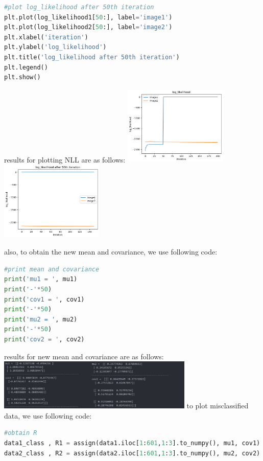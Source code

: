 \documentclass[12pt]{article}
\begin{document}
\begin{qsolve}
\begin{lstlisting}[language=Python,caption={plot NLL},label={code:plot NLL}]
#plot log_likelihood after 50th iteration
plt.plot(log_likelihood1[50:], label='image1')
plt.plot(log_likelihood2[50:], label='image2')
plt.xlabel('iteration')
plt.ylabel('log_likelihood')
plt.title('log_likelihood after 50th iteration')
plt.legend()
plt.show()
        \end{lstlisting}
    \splitqsolve
    results for plotting NLL are as follows:
    \tcblower
    \centering
    \includegraphics[width=0.37\textwidth]{outputs/output13.png}
    \label{fig:fig13}
    \includegraphics[width=0.37\textwidth]{outputs/output14.png}
    \label{fig:fig14}
    \splitqsolve

    also, to obtain the new mean and covariance, we use following code:
    \begin{lstlisting}[language=Python,caption={obtain new mean and covariance},label={code:obtain new mean and covariance}]
#print mean and covariance
print('mu1 = ', mu1)
print('-'*50)
print('cov1 = ', cov1)
print('-'*50)
print('mu2 = ', mu2)
print('-'*50)
print('cov2 = ', cov2)
    \end{lstlisting}
    \splitqsolve
    results for new mean and covariance are as follows:
    \tcblower
    \centering
    \includegraphics[width=0.7\textwidth]{outputs/output17.png}
    \label{fig:fig17}
    \splitqsolve
    to plot misclassified data, we use following code:
    \begin{lstlisting}[language=Python,caption={plot misclassified data},label={code:plot misclassified data}]
#obtain R
data1_class , R1 = assign(data1.iloc[1:601,1:3].to_numpy(), mu1, cov1)
data2_class , R2 = assign(data2.iloc[1:601,1:3].to_numpy(), mu2, cov2)


\end{lstlisting}
\end{qsolve}
\end{document}
